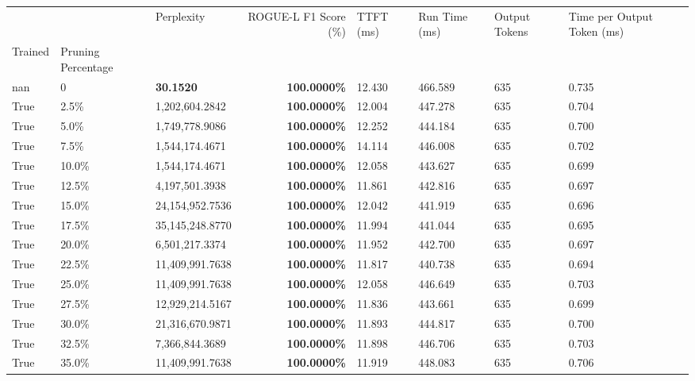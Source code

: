 \begin{table}[H]
\label{tab:evaluation-pipeline-9-trained}
\begin{tabular}{lllrllll}
\toprule
 &  & Perplexity & ROGUE-L F1 Score (\%) & TTFT (ms) & Run Time (ms) & Output Tokens & Time per Output Token (ms) \\
Trained & Pruning Percentage &  &  &  &  &  &  \\
\midrule
nan & 0 & \bfseries 30.1520 & \bfseries 100.0000\% & 12.430 & 466.589 & 635 & 0.735 \\
\cline{1-8}
True & 2.5\% & 1,202,604.2842 & \bfseries \color{red} 100.0000\% & 12.004 & 447.278 & 635 & 0.704 \\
\cline{1-8}
True & 5.0\% & 1,749,778.9086 & \bfseries \color{red} 100.0000\% & 12.252 & 444.184 & 635 & 0.700 \\
\cline{1-8}
True & 7.5\% & 1,544,174.4671 & \bfseries \color{red} 100.0000\% & 14.114 & 446.008 & 635 & 0.702 \\
\cline{1-8}
True & 10.0\% & 1,544,174.4671 & \bfseries \color{red} 100.0000\% & 12.058 & 443.627 & 635 & 0.699 \\
\cline{1-8}
True & 12.5\% & 4,197,501.3938 & \bfseries \color{red} 100.0000\% & 11.861 & 442.816 & 635 & 0.697 \\
\cline{1-8}
True & 15.0\% & 24,154,952.7536 & \bfseries \color{red} 100.0000\% & 12.042 & 441.919 & 635 & 0.696 \\
\cline{1-8}
True & 17.5\% & 35,145,248.8770 & \bfseries \color{red} 100.0000\% & 11.994 & 441.044 & 635 & 0.695 \\
\cline{1-8}
True & 20.0\% & 6,501,217.3374 & \bfseries \color{red} 100.0000\% & 11.952 & 442.700 & 635 & 0.697 \\
\cline{1-8}
True & 22.5\% & 11,409,991.7638 & \bfseries \color{red} 100.0000\% & 11.817 & 440.738 & 635 & 0.694 \\
\cline{1-8}
True & 25.0\% & 11,409,991.7638 & \bfseries \color{red} 100.0000\% & 12.058 & 446.649 & 635 & 0.703 \\
\cline{1-8}
True & 27.5\% & 12,929,214.5167 & \bfseries \color{red} 100.0000\% & 11.836 & 443.661 & 635 & 0.699 \\
\cline{1-8}
True & 30.0\% & 21,316,670.9871 & \bfseries \color{red} 100.0000\% & 11.893 & 444.817 & 635 & 0.700 \\
\cline{1-8}
True & 32.5\% & 7,366,844.3689 & \bfseries \color{red} 100.0000\% & 11.898 & 446.706 & 635 & 0.703 \\
\cline{1-8}
True & 35.0\% & 11,409,991.7638 & \bfseries \color{red} 100.0000\% & 11.919 & 448.083 & 635 & 0.706 \\

\end{tabular}
\end{table}

